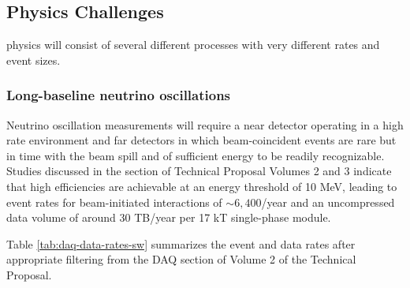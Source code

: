 
\subsection{Physics Challenges}

  physics will consist of several different processes with very different rates and event sizes. 


\subsubsection{Long-baseline neutrino oscillations} Neutrino oscillation measurements will require a near detector operating in a high rate environment and far detectors in which beam-coincident events are rare but in time with the beam spill and of sufficient energy to be readily recognizable.  Studies discussed in the  section of  Technical Proposal Volumes 2 and 3 indicate that high efficiencies are achievable at an energy threshold of 10 MeV, leading to event rates for beam-initiated  interactions of $\sim 6,400$/year and an uncompressed data volume of around 30 TB/year per 17 kT single-phase module. 


Table \ref{tab:daq-data-rates-sw} summarizes the event and data rates after appropriate filtering from the  DAQ section of Volume 2 of the Technical Proposal.

